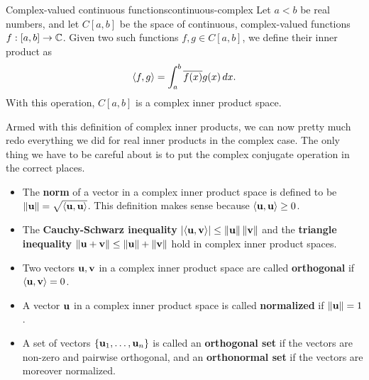 \begin{example}{Complex-valued continuous functions}{continuous-complex}
  Let $a<b$ be real numbers, and let $C[a,b]$ be the space of
  continuous, complex-valued functions $f : [a,b]\to\mathbb{C}$. Given two such
  functions $f,g\in C[a,b]$, we define their inner product as
  \begin{equation*}
    \langle f,g\rangle = \int_a^b \overline{f(x)}g(x)\,dx.
  \end{equation*}
  With this operation, $C[a,b]$ is a complex inner product space.
\end{example}

Armed with this definition of complex inner products, we can now
pretty much redo everything we did for real inner products in the
complex case. The only thing we have to be careful about is to put the
complex conjugate operation in the correct places.

\begin{itemize}
\item The \textbf{norm}%
   of a vector in a complex inner
  product space is defined to be
  $\norm{\vect{u}} = \sqrt{\iprod{\vect{u},\vect{u}}}$.  This
  definition makes sense because $\iprod{\vect{u},\vect{u}}\geq 0$.
\item The \textbf{Cauchy-Schwarz inequality}%
  $\abs{\iprod{\vect{u},\vect{v}}}\leq \norm{\vect{u}}\norm{\vect{v}}$
  and the \textbf{triangle inequality}%
  $\norm{\vect{u}+\vect{v}}\leq \norm{\vect{u}} + \norm{\vect{v}}$
  hold in complex inner product spaces.
\item Two vectors $\vect{u},\vect{v}$ in a complex inner product space
  are called \textbf{orthogonal}%
   if $\iprod{\vect{u},\vect{v}}=0$.
\item A vector $\vect{u}$ in a complex inner product space is called
  \textbf{normalized}%
   if $\norm{\vect{u}} = 1$.
\item A set of vectors $\set{\vect{u}_1,\ldots,\vect{u}_n}$ is called
  an \textbf{orthogonal set}%
   if the vectors are non-zero and pairwise
  orthogonal, and an \textbf{orthonormal set}%
   if the vectors are moreover normalized.
\end{itemize}


